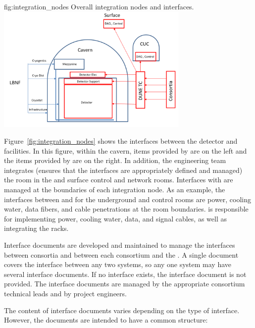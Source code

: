 \begin{dunefigure}{fig:integration_nodes}
  {Overall integration nodes and interfaces.}
  \includegraphics[width=0.7\textwidth]{graphics/Integration_nodes.png}
\end{dunefigure}
Figure~\ref{fig:integration_nodes} shows the interfaces between the
detector and facilities. In this figure, within the cavern, items
provided by  are on the left and the items provided by
 are on the right. In addition, the  engineering
team integrates (ensures that the interfaces are appropriately defined
and managed) the  room in the  and surface
control and network rooms. Interfaces with 
are managed at the boundaries of each integration node. As an example,
the interfaces between  and  for the
underground  and control rooms are power, cooling water,
data fibers, and cable penetrations at the room
boundaries.  is responsible for implementing power,
cooling water, data, and signal cables, as well as integrating the
racks.


Interface documents are developed and maintained to manage the
interfaces between consortia and between each consortium and the
. A single document covers the interface between any two
systems, so any one system may have several interface documents. If no
interface exists, the interface document is not provided.  The
interface documents are managed by the appropriate consortium
technical leads and by  project engineers.

The content of interface documents varies depending on the type
of interface. However, the documents are intended to have
a common structure: 

